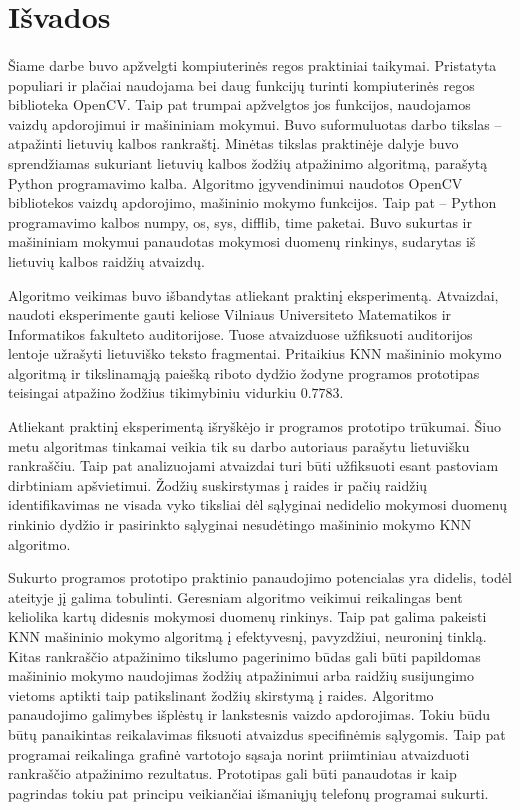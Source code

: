 \documentclass[a4paper,12pt]{article}
\begin{document}
\clearpage
\section*{Išvados}
\paragraph{}Šiame darbe buvo apžvelgti kompiuterinės regos praktiniai taikymai. Pristatyta populiari ir plačiai naudojama bei daug funkcijų turinti kompiuterinės regos biblioteka OpenCV. Taip pat trumpai apžvelgtos jos funkcijos, naudojamos vaizdų apdorojimui ir mašininiam mokymui. Buvo suformuluotas darbo tikslas – atpažinti lietuvių kalbos rankraštį. Minėtas tikslas praktinėje dalyje buvo sprendžiamas sukuriant lietuvių kalbos žodžių atpažinimo algoritmą, parašytą Python programavimo kalba. Algoritmo įgyvendinimui naudotos OpenCV bibliotekos vaizdų apdorojimo, mašininio mokymo funkcijos. Taip pat – Python programavimo kalbos numpy, os, sys, difflib, time paketai. Buvo sukurtas ir mašininiam mokymui panaudotas mokymosi duomenų rinkinys, sudarytas iš lietuvių kalbos raidžių atvaizdų.
 
Algoritmo veikimas buvo išbandytas atliekant praktinį eksperimentą. Atvaizdai, naudoti eksperimente gauti keliose Vilniaus Universiteto Matematikos ir Informatikos fakulteto auditorijose. Tuose atvaizduose užfiksuoti auditorijos lentoje užrašyti lietuviško teksto fragmentai. Pritaikius KNN mašininio mokymo algoritmą ir tikslinamąją paiešką riboto dydžio žodyne programos prototipas teisingai atpažino žodžius tikimybiniu vidurkiu \( 0.7783 \).

Atliekant praktinį eksperimentą išryškėjo ir programos prototipo trūkumai. Šiuo metu algoritmas tinkamai veikia tik su darbo autoriaus parašytu lietuvišku rankraščiu. Taip pat analizuojami atvaizdai turi būti užfiksuoti esant pastoviam dirbtiniam apšvietimui. Žodžių suskirstymas į raides ir pačių raidžių identifikavimas ne visada vyko tiksliai dėl sąlyginai nedidelio mokymosi duomenų rinkinio dydžio ir pasirinkto sąlyginai nesudėtingo mašininio mokymo KNN algoritmo.

Sukurto programos prototipo praktinio panaudojimo potencialas yra didelis, todėl ateityje jį galima tobulinti. Geresniam algoritmo veikimui reikalingas bent keliolika kartų didesnis mokymosi duomenų rinkinys. Taip pat galima pakeisti KNN mašininio mokymo algoritmą į efektyvesnį, pavyzdžiui, neuroninį tinklą. Kitas rankraščio atpažinimo tikslumo pagerinimo būdas gali būti papildomas mašininio mokymo naudojimas žodžių atpažinimui arba raidžių susijungimo vietoms aptikti taip patikslinant žodžių skirstymą į raides. Algoritmo panaudojimo galimybes išplėstų ir lankstesnis vaizdo apdorojimas. Tokiu būdu būtų panaikintas reikalavimas fiksuoti atvaizdus specifinėmis sąlygomis. Taip pat programai reikalinga grafinė vartotojo sąsaja norint priimtiniau atvaizduoti rankraščio atpažinimo rezultatus. Prototipas gali būti panaudotas ir kaip pagrindas tokiu pat principu veikiančiai išmaniųjų telefonų programai sukurti.
\end{document}
